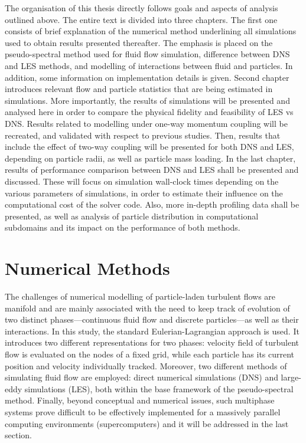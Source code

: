 \documentclass{pracamgren}
\begin{document}
The organisation of this thesis directly follows goals and aspects of analysis outlined above.
The entire text is divided into three chapters.
The first one consists of brief explanation of the numerical method underlining all simulations used to obtain results presented thereafter.
The emphasis is placed on the pseudo-spectral method used for fluid flow simulation, difference between DNS and LES methods, and modelling of interactions between fluid and particles.
In addition, some information on implementation details is given.
Second chapter introduces relevant flow and particle statistics that are being estimated in simulations.
More importantly, the results of simulations will be presented and analysed here in order to compare the physical fidelity and feasibility of LES vs DNS.
Results related to modelling under one-way momentum coupling will be recreated, and validated with respect to previous studies.
Then, results that include the effect of two-way coupling will be presented for both DNS and LES, depending on particle radii, as well as particle mass loading.
In the last chapter, results of performance comparison between DNS and LES shall be presented and discussed.
These will focus on simulation wall-clock times depending on the various parameters of simulations, in order to estimate their influence on the computational cost of the solver code.
Also, more in-depth profiling data shall be presented, as well as analysis of particle distribution in computational subdomains and its impact on the performance of both methods.



\chapter{Numerical Methods}
\label{ch:ch1}

The challenges of numerical modelling of particle-laden turbulent flows are manifold and are mainly associated with the need to keep track of evolution of two distinct phases---continuous fluid flow and discrete particles---as well as their interactions.
In this study, the standard Eulerian-Lagrangian approach is used.
It introduces two different representations for two phases: velocity field of turbulent flow is evaluated on the nodes of a fixed grid, while each particle has its current position and velocity individually tracked.
Moreover, two different methods of simulating fluid flow are employed: direct numerical simulations (DNS) and large-eddy simulations (LES), both within the base framework of the pseudo-spectral method.
Finally, beyond conceptual and numerical issues, such multiphase systems prove difficult to be effectively implemented for a massively parallel computing environments (supercomputers) and it will be addressed in the last section.
\end{document}
